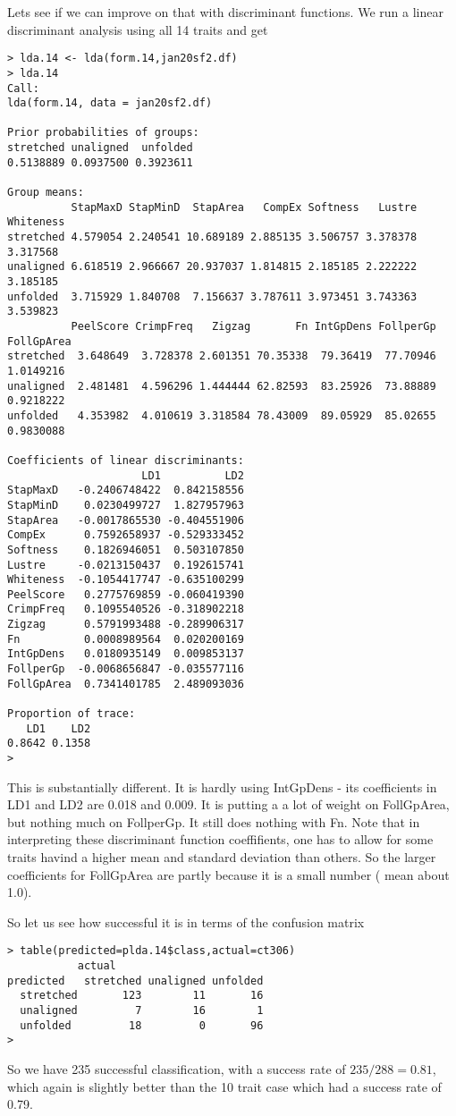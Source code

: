 \documentclass[titlepage]{article}  %
\begin{document}
Lets see if we can improve on that with discriminant functions. We run a linear discriminant analysis using all 14 traits and get
\begin{verbatim}
> lda.14 <- lda(form.14,jan20sf2.df)
> lda.14
Call:
lda(form.14, data = jan20sf2.df)

Prior probabilities of groups:
stretched unaligned  unfolded 
0.5138889 0.0937500 0.3923611 

Group means:
          StapMaxD StapMinD  StapArea   CompEx Softness   Lustre Whiteness
stretched 4.579054 2.240541 10.689189 2.885135 3.506757 3.378378  3.317568
unaligned 6.618519 2.966667 20.937037 1.814815 2.185185 2.222222  3.185185
unfolded  3.715929 1.840708  7.156637 3.787611 3.973451 3.743363  3.539823
          PeelScore CrimpFreq   Zigzag       Fn IntGpDens FollperGp FollGpArea
stretched  3.648649  3.728378 2.601351 70.35338  79.36419  77.70946  1.0149216
unaligned  2.481481  4.596296 1.444444 62.82593  83.25926  73.88889  0.9218222
unfolded   4.353982  4.010619 3.318584 78.43009  89.05929  85.02655  0.9830088

Coefficients of linear discriminants:
                     LD1          LD2
StapMaxD   -0.2406748422  0.842158556
StapMinD    0.0230499727  1.827957963
StapArea   -0.0017865530 -0.404551906
CompEx      0.7592658937 -0.529333452
Softness    0.1826946051  0.503107850
Lustre     -0.0213150437  0.192615741
Whiteness  -0.1054417747 -0.635100299
PeelScore   0.2775769859 -0.060419390
CrimpFreq   0.1095540526 -0.318902218
Zigzag      0.5791993488 -0.289906317
Fn          0.0008989564  0.020200169
IntGpDens   0.0180935149  0.009853137
FollperGp  -0.0068656847 -0.035577116
FollGpArea  0.7341401785  2.489093036

Proportion of trace:
   LD1    LD2 
0.8642 0.1358 
> 
\end{verbatim}
This is substantially different. It is hardly using IntGpDens - its coefficients in LD1 and LD2 are 0.018 and 0.009. It is putting a a lot of weight on FollGpArea, but nothing much on FollperGp. It still does nothing with Fn.  Note that in interpreting these discriminant function coeffifients, one has to allow for some traits havind a higher mean and standard deviation than others. So the larger coefficients for FollGpArea are partly because it is a small number ( mean about 1.0).

So let us see how successful it is in terms of the confusion matrix
\begin{verbatim}
> table(predicted=plda.14$class,actual=ct306)
           actual
predicted   stretched unaligned unfolded
  stretched       123        11       16
  unaligned         7        16        1
  unfolded         18         0       96
> 
\end{verbatim}
So we have 235 successful classification, with a success rate of $235/288=0.81$, which again is slightly better than the 10 trait case which had a success rate of 0.79. 
\end{document}
